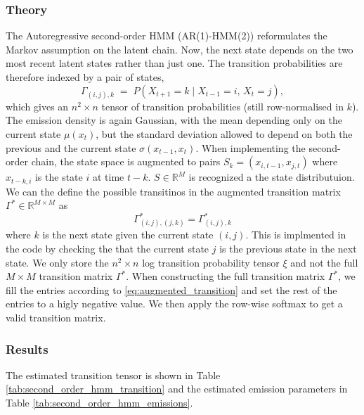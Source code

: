 \subsubsection{Theory}
The Autoregressive second-order HMM (AR(1)-HMM(2)) 
reformulates the Markov assumption on the latent chain. Now, the
next state depends on the two most recent latent states rather than
just one. The transition probabilities are therefore indexed by a pair of
states,
\begin{equation}
    \Gamma_{(i,j),k} \;=\; P\!\left(X_{t+1} = k \mid X_{t-1} = i,\, X_t = j\right),
    \label{eq:second_order_transition}
\end{equation}
which gives an $n^2 \times n$ tensor of transition probabilities (still
row-normalised in $k$). The emission density is again Gaussian, with the mean
depending only on the current state $\mu(x_t)$, but the standard deviation
allowed to depend on both the previous and the current state
$\sigma(x_{t-1}, x_t)$. When implementing the second-order chain, the 
state space is augmented to pairs $S_k = (x_{i, t-1}, x_{j, t})$ where $x_{t-k, i}$ is 
the state $i$ at time $t-k$. $S \in \mathbb{R}^M$ is recognized a the state distributuion. 
We can the define the possible transitinos in the augmented transition matrix $\Gamma^* \in \mathbb{R}^{M \times M}$ 
as 
\begin{equation}
    \Gamma^*_{(i,j),(j,k)} = \Gamma^*_{(i,j),k}
    \label{eq:augmented_transition}
\end{equation}
where $k$ is the next state given the current state $(i,j)$. 
This is implmented in the code by checking the that the current state $j$ 
is the previous state in the next state. 
We only store the $n^2 \times n$ log transition probability tensor $\xi$ and not the full $M \times M$ transition matrix $\Gamma^*$. 
When constructing the full transition matrix $\Gamma^*$, we fill the entries according to \ref{eq:augmented_transition} and set the rest of the entries to a
higly negative value. We then apply the row-wise softmax to get a valid transition matrix.

\subsubsection{Results}
The estimated transition tensor is shown in
Table \ref{tab:second_order_hmm_transition} and the estimated emission
parameters in Table \ref{tab:second_order_hmm_emissions}.

